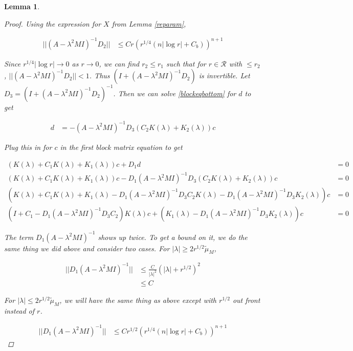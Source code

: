 \documentclass[12pt]{article}
\newtheorem{lemma}{Lemma}
\begin{document}
\begin{lemma}
\begin{proof}
Using the expression for $X$ from Lemma \ref{reparam}, 

\begin{align*}
|| (A - \lambda^2 MI)^{-1} D_2 ||
&\leq C r \left( r^{1/4} (n |\log r| + C_b )\right)^{n+1}
\end{align*}

Since $r^{1/4} |\log r| \rightarrow 0$ as $r \rightarrow 0$, we can find $r_2 \leq r_1$ such that for $r \in \mathcal{R}$ with $\leq r_2$, $|| (A - \lambda^2 MI)^{-1} D_2 || < 1$. Thus $(I + (A - \lambda^2 MI)^{-1} D_2)$ is invertible. Let $D_3 = (I + (A - \lambda^2 MI)^{-1} D_2)^{-1}$. Then we can solve \eqref{blockeqbottom} for $d$ to get

\begin{align*}
d &= -(A - \lambda^2 MI)^{-1} D_3 (C_2 K(\lambda) + K_2(\lambda))c
\end{align*}

Plug this in for $c$ in the first block matrix equation to get

\begin{align*}
(K(\lambda) + C_1 K(\lambda) + K_1(\lambda))c + D_1 d &= 0 \\
(K(\lambda) + C_1 K(\lambda) + K_1(\lambda))c - D_1 (A - \lambda^2 MI)^{-1} D_3 (C_2 K(\lambda) + K_2(\lambda))c &= 0 \\
(K(\lambda) + C_1 K(\lambda) + K_1(\lambda) - D_1 (A - \lambda^2 MI)^{-1} D_3 C_2 K(\lambda) - D_1 (A - \lambda^2 MI)^{-1} D_3 K_2(\lambda))c &= 0 \\
(I + C_1 - D_1 (A - \lambda^2 MI)^{-1} D_3 C_2) K(\lambda)c + (K_1(\lambda) - D_1 (A - \lambda^2 MI)^{-1} D_3 K_2(\lambda))c &= 0
\end{align*}

The term $D_1 (A - \lambda^2 MI)^{-1}$ shows up twice. To get a bound on it, we do the same thing we did above and consider two cases. For $|\lambda| \geq 2 r^{1/2} \tilde{\mu}_M$,

\begin{align*}
|| D_1 (A - \lambda^2 MI)^{-1} || &\leq \frac{C}{|\lambda|^2} (|\lambda| + r^{1/2})^2 \\ 
&\leq C
\end{align*}

For $|\lambda| \leq 2 r^{1/2} \tilde{\mu}_M$, we will have the same thing as above except with $r^{1/2}$ out front instead of $r$.

\begin{align*}
|| D_1 (A - \lambda^2 MI)^{-1} || &\leq C r^{1/2} \left( r^{1/4} (n |\log r| + C_b )\right)^{n+1}
\end{align*}


\end{proof}
\end{lemma}
\end{document}
